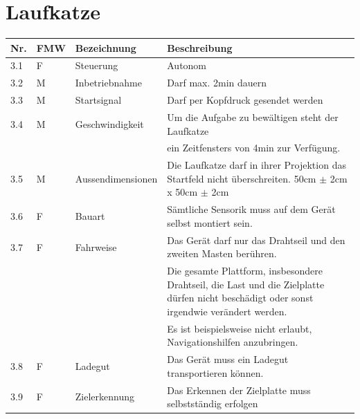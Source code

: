 \documentclass[a4paper]{report}
\begin{document}
\section{Laufkatze}
\label{app:sec:LaufKatze}
\begin{tabular}{|p{}|p{}|p{}|p{}|}
	\hline
	\textbf{Nr.} & \textbf{FMW\footnotemark} & \textbf{Bezeichnung} & \textbf{Beschreibung} \\
	\hline
	3.1 & F & Steuerung & Autonom \\
	\hline
	3.2 & M & Inbetriebnahme & Darf max. 2min dauern \\
	\hline
	3.3 & M & Startsignal & Darf per Kopfdruck gesendet werden \\
	\hline
	3.4 & M & Geschwindigkeit & Um die Aufgabe zu bewältigen steht der Laufkatze\\
	& & & ein Zeitfensters von 4min zur Verfügung. \\
	\hline
	3.5 & M & Aussendimensionen & Die Laufkatze darf in ihrer Projektion das Startfeld nicht überschreiten. 50cm $\pm$ 2cm x 50cm $\pm$ 2cm \\
	\hline
	3.6 & F & Bauart & Sämtliche Sensorik muss auf dem Gerät selbst montiert sein. \\
	\hline
	3.7 & F & Fahrweise & Das Gerät darf nur das Drahtseil und den zweiten Masten berühren.\\
	& & & Die gesamte Plattform, insbesondere Drahtseil, die Last und die Zielplatte dürfen nicht beschädigt oder sonst irgendwie verändert werden.\\
	& & & Es ist beispielsweise nicht erlaubt, Navigationshilfen anzubringen. \\
	\hline
	3.8 & F & Ladegut & Das Gerät muss ein Ladegut transportieren können. \\
	\hline
	3.9 & F & Zielerkennung & Das Erkennen der Zielplatte muss selbstständig erfolgen\\
	\hline
\end{tabular}
\end{document}
